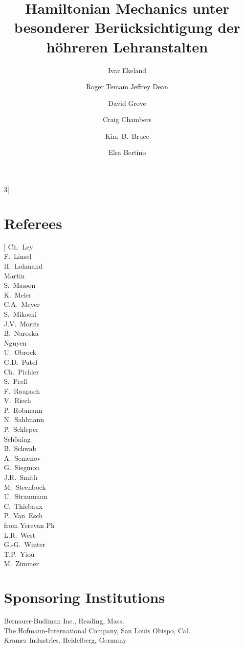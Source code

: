 \documentclass{llncs}
\begin{document}
\begin{multicols}{3}[\section*{Referees}]
Ch.~Ley\\
F.~Linsel\\
H.~Lohmand\\
Martin\\
S.~Masson\\
K.~Meier\\
C.A.~Meyer\\
S.~Mikocki\\
J.V.~Morris\\
B.~Naroska\\
Nguyen\\
U.~Obrock\\
G.D.~Patel\\
Ch.~Pichler\\
S.~Prell\\
F.~Raupach\\
V.~Riech\\
P.~Robmann\\
N.~Sahlmann\\
P.~Schleper\\
Sch\"oning\\
B.~Schwab\\
A.~Semenov\\
G.~Siegmon\\
J.R.~Smith\\
M.~Steenbock\\
U.~Straumann\\
C.~Thiebaux\\
P.~Van~Esch\\
from Yerevan Ph\\
L.R.~West\\
G.-G.~Winter\\
T.P.~Yiou\\
M.~Zimmer\end{multicols}
\section*{Sponsoring Institutions}
Bernauer-Budiman Inc., Reading, Mass.\\
The Hofmann-International Company, San Louis Obispo, Cal.\\
Kramer Industries, Heidelberg, Germany
\tableofcontents
\mainmatter              \title{Hamiltonian Mechanics unter besonderer Ber\"ucksichtigung der
h\"ohreren Lehranstalten}
  \author{Ivar Ekeland \and Roger Temam
Jeffrey Dean \and David Grove \and Craig Chambers \and Kim~B.~Bruce \and
Elsa Bertino}
 
\end{document}
